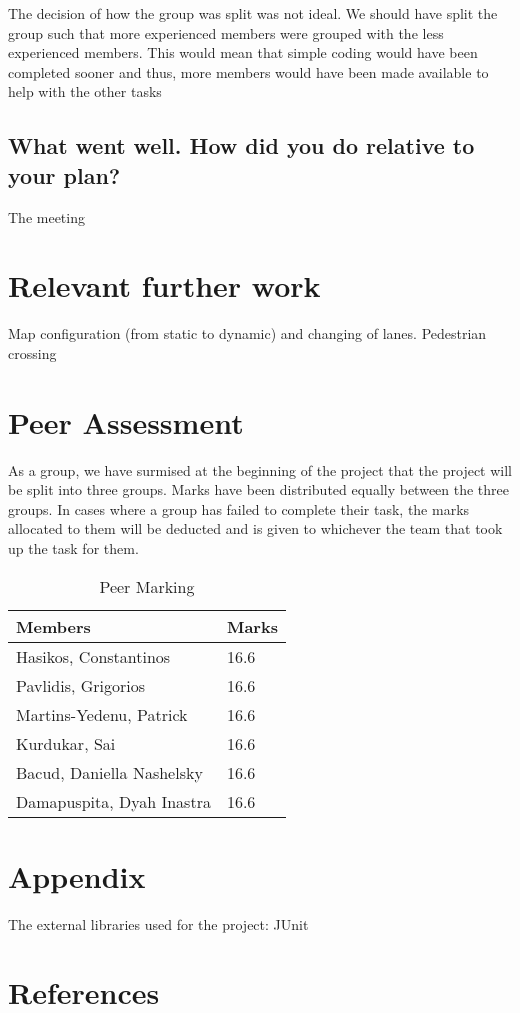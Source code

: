 \documentclass{article} \usepackage{graphicx}
\begin{document}
			The decision of how the group was split was not ideal. We should have split the group such that more experienced members were grouped with the less experienced members.  This would mean that simple  coding would have been completed sooner and thus, more members would have been made available to help with the other tasks
			
		\subsection{What went well.  How did you do relative to your plan?}
		The meeting 	
		
		\section{Relevant further work}  
			Map configuration (from static to dynamic) and changing of lanes. Pedestrian crossing
		
	\section{Peer Assessment}
		As a group, we have surmised at the beginning of the project that the project will be split into three groups.  Marks have been distributed equally between the three groups. In cases where a group has failed to complete their task, the marks allocated to them will be deducted and is given to whichever the team that took up the task for them.

\begin{table}[h]
	\centering
    \begin{tabular}{|l|l|}
    \hline
    \textbf{Members}                   & \textbf{Marks} \\ \hline
    Hasikos, Constantinos     & 16.6  \\ \hline
    Pavlidis, Grigorios       & 16.6  \\ \hline
    Martins-Yedenu, Patrick   & 16.6  \\ \hline
    Kurdukar, Sai             & 16.6  \\ \hline
    Bacud, Daniella Nashelsky & 16.6  \\ \hline
    Damapuspita, Dyah Inastra & 16.6  \\ \hline
    \end{tabular}
    \caption {Peer Marking}
\end{table}

	\section{Appendix}
		The external libraries used for the project:  
		JUnit
	\section{References}	
\end{document}
